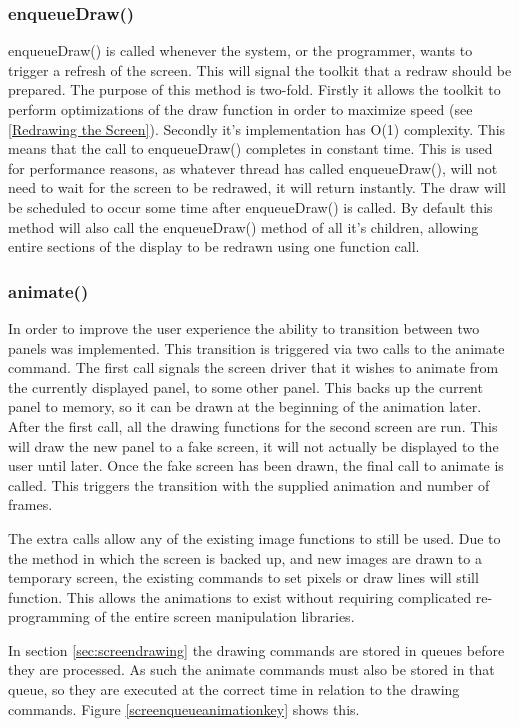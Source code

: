 \subsubsection{enqueueDraw()}

enqueueDraw() is called whenever the system, or the programmer, wants to trigger a refresh of the screen. This will signal the toolkit that a redraw should be prepared. The purpose of this method is two-fold. Firstly it allows the toolkit to perform optimizations of the draw function in order to maximize speed (see \ref{Redrawing the Screen}). Secondly it's implementation has O(1) complexity. This means that the call to enqueueDraw() completes in constant time. This is used for performance reasons, as whatever thread has called enqueueDraw(), will not need to wait for the screen to be redrawed, it will return instantly. The draw will be scheduled to occur some time after enqueueDraw() is called. By default this method will also call the enqueueDraw() method of all it's children, allowing entire sections of the display to be redrawn using one function call.

\subsubsection{animate()}

In order to improve the user experience the ability to transition between two panels was implemented. This transition is triggered via two calls to the animate command. The first call signals the screen driver that it wishes to animate from the currently displayed panel, to some other panel. This backs up the current panel to memory, so it can be drawn at the beginning of the animation later. After the first call, all the drawing functions for the second screen are run. This will draw the new panel to a fake screen, it will not actually be displayed to the user until later. Once the fake screen has been drawn, the final call to animate is called. This triggers the transition with the supplied animation and number of frames.

The extra calls allow any of the existing image functions to still be used. Due to the method in which the screen is backed up, and new images are drawn to a temporary screen, the existing commands to set pixels or draw lines will still function. This allows the animations to exist without requiring complicated re-programming of the entire screen manipulation libraries. 

In section \ref{sec:screendrawing} the drawing commands are stored in queues before they are processed. As such  the animate commands must also be stored in that queue, so they are executed at the correct time in relation to the drawing commands. Figure \ref{screenqueueanimationkey} shows this.


